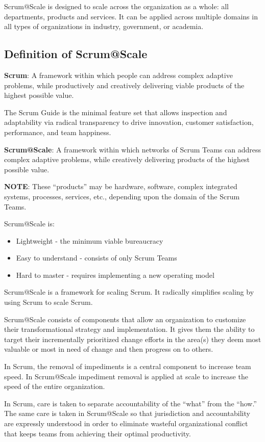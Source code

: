 \documentclass[12pt,a4paper,parskip=full]{scrartcl}
\begin{document}
Scrum@Scale is designed to scale across the organization as a whole: all departments, products and services. It can be applied across multiple domains in all types of organizations in industry, government, or academia.

\subsection{Definition of Scrum@Scale}

\textbf{Scrum}: A framework within which people can address complex adaptive problems, while productively and creatively delivering viable products of the highest possible value.

The Scrum Guide is the minimal feature set that allows inspection and adaptability via radical transparency to drive innovation, customer satisfaction, performance, and team happiness.

\textbf{Scrum@Scale}: A framework within which networks of Scrum Teams can address complex adaptive problems, while creatively delivering products of the highest possible value.

\textbf{NOTE}: These ``products'' may be hardware, software, complex integrated systems, processes, services, etc., depending upon the domain of the Scrum Teams.

Scrum@Scale is:
\begin{itemize}
	\item Lightweight - the minimum viable bureaucracy
	\item Easy to understand - consists of only Scrum Teams
	\item Hard to master - requires implementing a new operating model
\end{itemize}

Scrum@Scale is a framework for scaling Scrum. It radically simplifies scaling by using Scrum to scale Scrum. 

Scrum@Scale consists of components that allow an organization to customize their transformational strategy and implementation. It gives them the ability to target their incrementally prioritized change efforts in the area(s) they deem most valuable or most in need of change and then progress on to others. 

In Scrum, the removal of impediments is a central component to increase team speed. In Scrum@Scale impediment removal is applied at scale to increase the speed of the entire organization.

In Scrum, care is taken to separate accountability of the ``what'' from the ``how.'' The same care is taken in Scrum@Scale so that jurisdiction and accountability are expressly understood in order to eliminate wasteful organizational conflict that keeps teams from achieving their optimal productivity.
\end{document}
